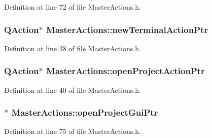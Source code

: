 Definition at line 72 of file Master\-Actions.\-h.

\hypertarget{class_master_actions_a6c3b1d9319fbf23f5a7cbe8305e16fc1}{
\subsubsection[{new\-Terminal\-Action\-Ptr}]{\setlength{\rightskip}{0pt plus 5cm}Q\-Action$\ast$ Master\-Actions\-::new\-Terminal\-Action\-Ptr\hspace{0.3cm}{\ttfamily [private]}}}\label{class_master_actions_a6c3b1d9319fbf23f5a7cbe8305e16fc1}


Definition at line 38 of file Master\-Actions.\-h.

\hypertarget{class_master_actions_a3b4d98cdbfaa8e287d420513a8df53ee}{
\subsubsection[{open\-Project\-Action\-Ptr}]{\setlength{\rightskip}{0pt plus 5cm}Q\-Action$\ast$ Master\-Actions\-::open\-Project\-Action\-Ptr\hspace{0.3cm}{\ttfamily [private]}}}\label{class_master_actions_a3b4d98cdbfaa8e287d420513a8df53ee}


Definition at line 40 of file Master\-Actions.\-h.

\hypertarget{class_master_actions_a6caf7325dd9cb26f72c81a8c877db634}{
\subsubsection[{open\-Project\-Gui\-Ptr}]{$\ast$ Master\-Actions\-::open\-Project\-Gui\-Ptr\hspace{0.3cm}{\ttfamily [private]}}}\label{class_master_actions_a6caf7325dd9cb26f72c81a8c877db634}


Definition at line 75 of file Master\-Actions.\-h.

